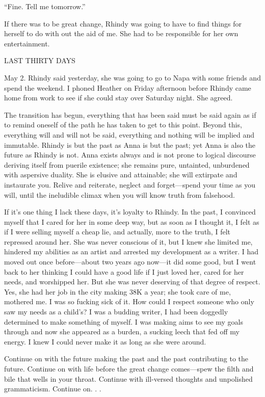 ``Fine. Tell me tomorrow.''

If there was to be great change, Rhindy was going to have to find things
for herself to do with out the aid of me. She had to be responsible for
her own entertainment.

LAST THIRTY DAYS

May 2. Rhindy said yesterday, she was going to go to Napa with some
friends and spend the weekend. I phoned Heather on Friday afternoon
before Rhindy came home from work to see if she could stay over Saturday
night. She agreed.

The transition has begun, everything that has been said must be said
again as if to remind oneself of the path he has taken to get to this
point. Beyond this, everything will and will not be said, everything and
nothing will be implied and immutable. Rhindy is but the past as Anna is
but the past; yet Anna is also the future as Rhindy is not. Anna exists
always and is not prone to logical discourse deriving itself from
puerile existence; she remains pure, untainted, unburdened with
aspersive duality. She is elusive and attainable; she will extirpate and
instaurate you. Relive and reiterate, neglect and forget---spend your
time as you will, until the ineludible climax when you will know truth
from falsehood.

If it's one thing I lack these days, it's loyalty to Rhindy. In the
past, I convinced myself that I cared for her in some deep way, but as
soon as I thought it, I felt as if I were selling myself a cheap lie,
and actually, more to the truth, I felt repressed around her. She was
never conscious of it, but I knew she limited me, hindered my abilities
as an artist and arrested my development as a writer. I had moved out
once before---about two years ago now---it did some good, but I went
back to her thinking I could have a good life if I just loved her, cared
for her needs, and worshipped her. But she was never deserving of that
degree of respect. Yes, she had her job in the city making 38K a year;
she took care of me, mothered me. I was so fucking sick of it. How could
I respect someone who only saw my needs as a child's? I was a budding
writer, I had been doggedly determined to make something of myself. I
was making aims to see my goals through and now she appeared as a
burden, a sucking leech that fed off my energy. I knew I could never
make it as long as she were around.

Continue on with the future making the past and the past contributing to
the future. Continue on with life before the great change comes---spew
the filth and bile that wells in your throat. Continue with ill-versed
thoughts and unpolished grammaticism. Continue on. . .

